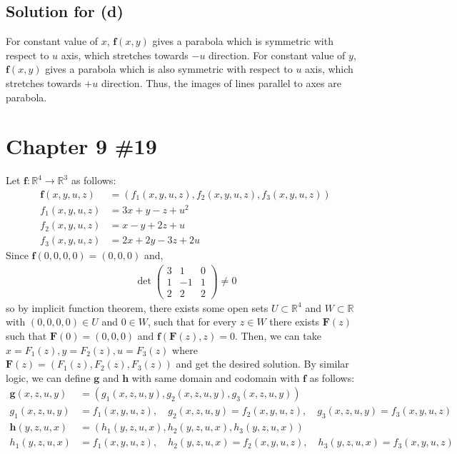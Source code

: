 \documentclass{scrartcl}
\begin{document}
\subsection{Solution for (d)}
For constant value of \(x\), \(\mathbf{f}(x, y)\) gives a parabola which is
symmetric with respect to \(u\) axis, which stretches towards \(-u\) direction.
For constant value of \(y\), \(\mathbf{f}(x, y)\) gives a parabola which is
also symmetric with respect to \(u\) axis, which stretches towards \(+u\)
direction. Thus, the images of lines parallel to axes are parabola.

\section{Chapter 9 \#19}
Let \(\mathbf{f}: \mathbb{R}^4 \to \mathbb{R}^3\) as follows:
\begin{align*}
  \mathbf{f}(x, y, u, z)
  &= (f_1(x, y, u, z), f_2(x, y, u, z), f_3(x, y, u, z)) \\
  f_1(x, y, u, z)
  &= 3x + y - z + u^2 \\
  f_2(x, y, u, z)
  &= x - y + 2z + u \\
  f_3(x, y, u, z)
  &= 2x + 2y - 3z + 2u
\end{align*}
Since \(\mathbf{f}(0, 0, 0, 0) = (0, 0, 0)\) and,
\begin{align*}
  \det \begin{pmatrix}
    3 & 1 & 0 \\
    1 & -1 & 1 \\
    2 & 2 & 2
  \end{pmatrix}
  \not = 0
\end{align*}
so by implicit function theorem, there exists some open sets \(U \subset
\mathbb{R}^4\) and \(W \subset \mathbb{R}\) with \((0, 0, 0, 0) \in U\) and \(0
\in W\), such that for every \(z \in W\) there exists \(\mathbf{F}(z)\) such
that \(\mathbf{F}(0) = (0, 0, 0)\) and \(\mathbf{f}(\mathbf{F}(z), z) = 0\).
Then, we can take \(x = F_1(z), y = F_2(z), u = F_3(z)\) where \(\mathbf{F}(z)
= (F_1(z), F_2(z), F_3(z))\) and get the desired solution. By similar logic, we
can define \(\mathbf{g}\) and \(\mathbf{h}\) with same domain and codomain with
\(\mathbf{f}\) as follows:
\begin{align*}
  \mathbf{g}(x, z, u, y)
  &= (g_1(x, z, u, y), g_2(x, z, u, y), g_3(x, z, u, y)) \\
  g_1(x, z, u, y)
  &= f_1(x, y, u, z), \quad
  g_2(x, z, u, y)
  = f_2(x, y, u, z), \quad
  g_3(x, z, u, y)
  = f_3(x, y, u, z) \\
  \mathbf{h}(y, z, u, x)
  &= (h_1(y, z, u, x), h_2(y, z, u, x), h_3(y, z, u, x)) \\
  h_1(y, z, u, x)
  &= f_1(x, y, u, z), \quad
  h_2(y, z, u, x)
  = f_2(x, y, u, z), \quad
  h_3(y, z, u, x)
  = f_3(x, y, u, z)
\end{align*}
\end{document}
